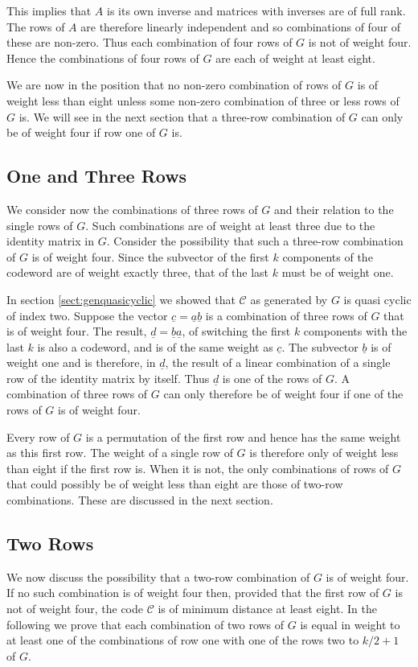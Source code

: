 This implies that $A$ is its own inverse and matrices with inverses are of full rank.
The rows of $A$ are therefore linearly independent and so combinations of four of these are non-zero.
Thus each combination of four rows of $G$ is not of weight four.
Hence the combinations of four rows of $G$ are each of weight at least eight.

We are now in the position that no non-zero combination of rows of $G$ is of weight less than eight unless some non-zero combination of three or less rows of $G$ is.
We will see in the next section that a three-row combination of $G$ can only be of weight four if row one of $G$ is.

\subsection{One and Three Rows}
\label{sect:genonethreerows}
We consider now the combinations of three rows of $G$ and their relation to the single rows of $G$.
Such combinations are of weight at least three due to the identity matrix in $G$.
Consider the possibility that such a three-row combination of $G$ is of weight four.
Since the subvector of the first $k$ components of the codeword are of weight exactly three, that of the last $k$ must be of weight one.

In section \ref{sect:genquasicyclic} we showed that $\mathcal{C}$ as generated by $G$ is quasi cyclic of index two.
Suppose the vector $\underline{c} = \underline{a} \underline{b}$ is a combination of three rows of $G$ that is of weight four.
The result, $\underline{d} = \underline{b} \underline{a}$, of switching the first $k$ components with the last $k$ is also a codeword, and is of the same weight as $\underline{c}$.
The subvector $\underline{b}$ is of weight one and is therefore, in $\underline{d}$, the result of a linear combination of a single row of the identity matrix by itself.
Thus $\underline{d}$ is one of the rows of $G$.
A combination of three rows of $G$ can only therefore be of weight four if one of the rows of $G$ is of weight four.

Every row of $G$ is a permutation of the first row and hence has the same weight as this first row.
The weight of a single row of $G$ is therefore only of weight less than eight if the first row is.
When it is not, the only combinations of rows of $G$ that could possibly be of weight less than eight are those of two-row combinations.
These are discussed in the next section.

\subsection{Two Rows}
We now discuss the possibility that a two-row combination of $G$ is of weight four.
If no such combination is of weight four then, provided that the first row of $G$ is not of weight four, the code $\mathcal{C}$ is of minimum distance at least eight.
In the following we prove that each combination of two rows of $G$ is equal in weight to at least one of the combinations of row one with one of the rows two to $k/2 + 1$ of $G$.

